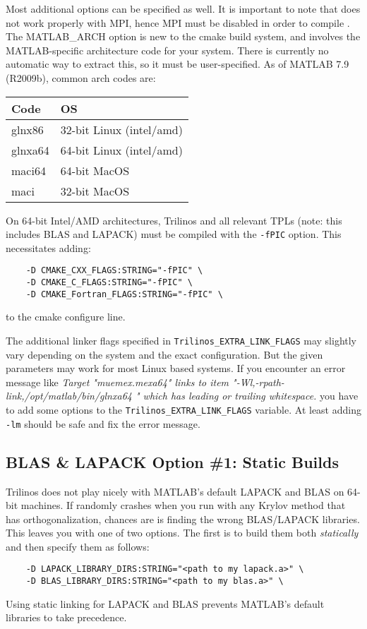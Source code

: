 Most additional options can be specified as well.  It is important to
note that \muemex does not work properly with MPI, hence MPI must be
disabled in order to compile \muemex.  The MATLAB\_ARCH option is new to
the cmake build system, and involves the MATLAB-specific architecture
code for your system.  There is currently no automatic way to extract
this, so it must be user-specified.  As of MATLAB 7.9 (R2009b), common
arch codes are:
\begin{center}
\begin{tabular}{l|l}
Code& OS\\
\hline
glnx86& 32-bit Linux (intel/amd)\\
glnxa64& 64-bit Linux (intel/amd)\\
maci64& 64-bit MacOS\\
maci& 32-bit MacOS\\
\end{tabular}
\end{center}

On 64-bit Intel/AMD architectures, Trilinos and all relevant TPLs
(note: this includes BLAS and LAPACK)
must be compiled with the \texttt{-fPIC} option.  This necessitates adding:
\begin{lstlisting}
    -D CMAKE_CXX_FLAGS:STRING="-fPIC" \
    -D CMAKE_C_FLAGS:STRING="-fPIC" \
    -D CMAKE_Fortran_FLAGS:STRING="-fPIC" \
\end{lstlisting}
to the cmake configure line.

The additional linker flags specified in \texttt{Trilinos\_EXTRA\_LINK\_FLAGS} may slightly vary depending on the system and the exact configuration. But the given parameters may work for most Linux based systems.
If you encounter an error message like \textit{Target "muemex.mexa64" links to item "-Wl,-rpath-link,/opt/matlab/bin/glnxa64 " which has leading or trailing whitespace.} you have to add some options to the \texttt{Trilinos\_EXTRA\_LINK\_FLAGS} variable. At least adding \texttt{-lm} should be safe and fix the error message.

\subsection{BLAS \& LAPACK Option \#1: Static Builds}
Trilinos does not play nicely with MATLAB's default LAPACK and BLAS on
64-bit machines.
If \muemex randomly crashes when you run with any Krylov method that
has orthogonalization, chances are \muemex is finding the wrong
BLAS/LAPACK libraries.
This leaves you
with one of two options.  The first is to build them both \textit{statically}
and then specify them as follows:
\begin{lstlisting}
    -D LAPACK_LIBRARY_DIRS:STRING="<path to my lapack.a>" \
    -D BLAS_LIBRARY_DIRS:STRING="<path to my blas.a>" \
\end{lstlisting}
Using static linking for LAPACK and BLAS prevents MATLAB's default libraries to take precedence.

